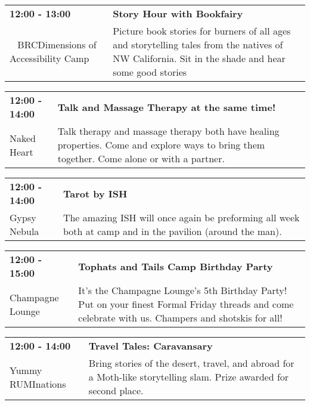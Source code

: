 \begin{tabular}{ p{1in} p{2.2in} }
    \textbf{12:00 - 13:00} & \textbf{Story Hour with Bookfairy} \\
    ~ \newline BRCDimensions of Accessibility Camp & Picture book stories for burners of all ages and storytelling tales from the natives of NW  California. Sit in the shade and hear some good stories \\
    \hline 
\end{tabular}
    
\begin{tabular}{ p{1in} p{2.2in} }
    \textbf{12:00 - 14:00} & \textbf{Talk and Massage Therapy at the same time!} \\
    Naked Heart \newline  & Talk therapy and massage therapy both have healing properties. Come and explore ways to bring them together. Come alone or with a partner. \\
    \hline 
\end{tabular}
    
\begin{tabular}{ p{1in} p{2.2in} }
    \textbf{12:00 - 14:00} & \textbf{Tarot by ISH} \\
    Gypsy Nebula \newline  & The amazing ISH will once again be preforming all week both at camp and in the pavilion (around the man). \\
    \hline 
\end{tabular}
    
\begin{tabular}{ p{1in} p{2.2in} }
    \textbf{12:00 - 15:00} & \textbf{Tophats and Tails Camp Birthday Party} \\
    Champagne Lounge \newline  & It's the Champagne Lounge's 5th Birthday Party! Put on your finest Formal Friday threads and come  celebrate with us. Champers and shotskis for all! \\
    \hline 
\end{tabular}
    
\begin{tabular}{ p{1in} p{2.2in} }
    \textbf{12:00 - 14:00} & \textbf{Travel Tales: Caravansary} \\
    Yummy RUMInations \newline  & Bring stories of the desert, travel, and abroad for a Moth-like storytelling slam. Prize awarded for second place. \\
    \hline 
\end{tabular}
    
